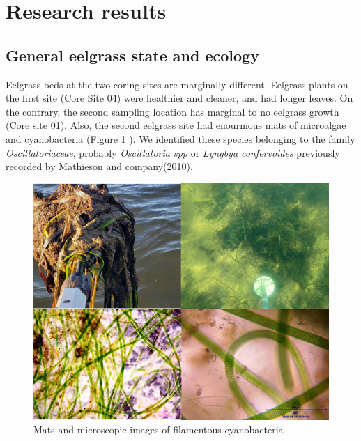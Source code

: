 \documentclass[
  12pt,
]{article}
\begin{document}
\newpage

\hypertarget{research-results}{%
\section{Research results}\label{research-results}}

\hypertarget{general-eelgrass-state-and-ecology}{%
\subsection{General eelgrass state and
ecology}\label{general-eelgrass-state-and-ecology}}

Eelgrass beds at the two coring sites are marginally different. Eelgrass
plants on the first site (Core Site 04) were healthier and cleaner, and
had longer leaves. On the contrary, the second sampling location has
marginal to no eelgrass growth (Core site 01). Also, the second eelgrass
site had enourmous mats of microalgae and cyanobacteria (Figure
\ref{fig:bacteria} ). We identified these species belonging to the
family \emph{Oscillatoriaceae}, probably \emph{Oscillatoria spp} or
\emph{Lyngbya confervoides} previously recorded by Mathieson and
company(2010).

\begin{figure}

{\centering \includegraphics[width=1\linewidth]{CyanoBacteria} 

}

\caption{Mats and microscopic images of filamentous cyanobacteria}\label{fig:bacteria}
\end{figure}
\end{document}
